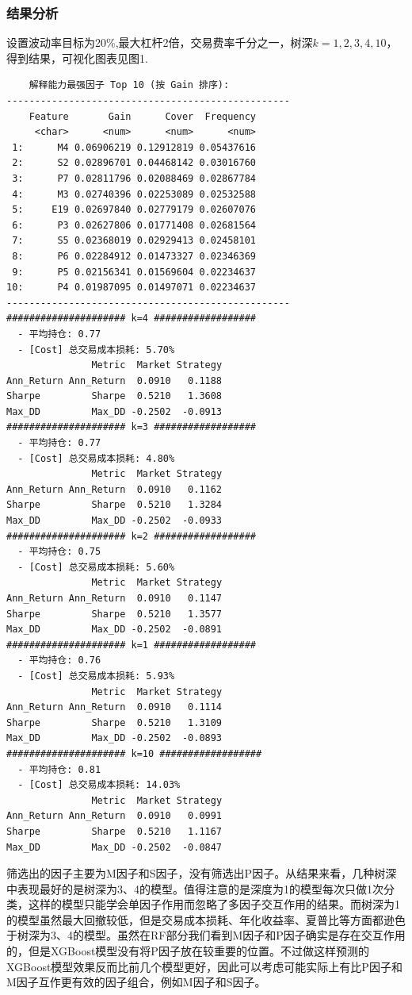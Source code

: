 \documentclass[11pt, a4paper]{article}
\begin{document}
\subsubsection{结果分析}
设置波动率目标为20\%,最大杠杆2倍，交易费率千分之一，树深$k=1,2,3,4,10$，得到结果，可视化图表见图1.
\begin{verbatim}
    解释能力最强因子 Top 10 (按 Gain 排序):
--------------------------------------------------
    Feature       Gain      Cover  Frequency
     <char>      <num>      <num>      <num>
 1:      M4 0.06906219 0.12912819 0.05437616
 2:      S2 0.02896701 0.04468142 0.03016760
 3:      P7 0.02811796 0.02088469 0.02867784
 4:      M3 0.02740396 0.02253089 0.02532588
 5:     E19 0.02697840 0.02779179 0.02607076
 6:      P3 0.02627806 0.01771408 0.02681564
 7:      S5 0.02368019 0.02929413 0.02458101
 8:      P6 0.02284912 0.01473327 0.02346369
 9:      P5 0.02156341 0.01569604 0.02234637
10:      P4 0.01987095 0.01497071 0.02234637
--------------------------------------------------
##################### k=4 ##################
  - 平均持仓: 0.77 
  - [Cost] 总交易成本损耗: 5.70%
               Metric  Market Strategy
Ann_Return Ann_Return  0.0910   0.1188
Sharpe         Sharpe  0.5210   1.3608
Max_DD         Max_DD -0.2502  -0.0913
##################### k=3 ##################
  - 平均持仓: 0.77 
  - [Cost] 总交易成本损耗: 4.80%
               Metric  Market Strategy
Ann_Return Ann_Return  0.0910   0.1162
Sharpe         Sharpe  0.5210   1.3284
Max_DD         Max_DD -0.2502  -0.0933
##################### k=2 ##################
  - 平均持仓: 0.75 
  - [Cost] 总交易成本损耗: 5.60%
               Metric  Market Strategy
Ann_Return Ann_Return  0.0910   0.1147
Sharpe         Sharpe  0.5210   1.3577
Max_DD         Max_DD -0.2502  -0.0891
##################### k=1 ##################
  - 平均持仓: 0.76 
  - [Cost] 总交易成本损耗: 5.93%
               Metric  Market Strategy
Ann_Return Ann_Return  0.0910   0.1114
Sharpe         Sharpe  0.5210   1.3109
Max_DD         Max_DD -0.2502  -0.0893
##################### k=10 ##################
  - 平均持仓: 0.81 
  - [Cost] 总交易成本损耗: 14.03%
               Metric  Market Strategy
Ann_Return Ann_Return  0.0910   0.0991
Sharpe         Sharpe  0.5210   1.1167
Max_DD         Max_DD -0.2502  -0.0847
\end{verbatim}
筛选出的因子主要为M因子和S因子，没有筛选出P因子。从结果来看，几种树深中表现最好的是树深为3、4的模型。值得注意的是深度为1的模型每次只做1次分类，这样的模型只能学会单因子作用而忽略了多因子交互作用的结果。而树深为1的模型虽然最大回撤较低，但是交易成本损耗、年化收益率、夏普比等方面都逊色于树深为3、4的模型。虽然在RF部分我们看到M因子和P因子确实是存在交互作用的，但是XGBoost模型没有将P因子放在较重要的位置。不过做这样预测的XGBoost模型效果反而比前几个模型更好，因此可以考虑可能实际上有比P因子和M因子互作更有效的因子组合，例如M因子和S因子。
\end{document}
